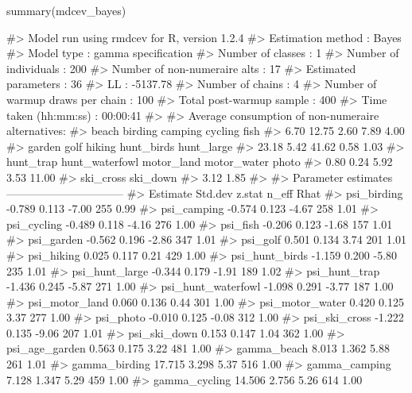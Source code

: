 \begin{example}
summary(mdcev_bayes)

#> Model run using rmdcev for R, version 1.2.4 
#> Estimation method                : Bayes
#> Model type                       : gamma specification
#> Number of classes                : 1
#> Number of individuals            : 200
#> Number of non-numeraire alts     : 17
#> Estimated parameters             : 36
#> LL                               : -5137.78
#> Number of chains                 : 4
#> Number of warmup draws per chain : 100
#> Total post-warmup sample         : 400
#> Time taken (hh:mm:ss)            : 00:00:41
#> 
#> Average consumption of non-numeraire alternatives:
#>          beach        birding        camping        cycling           fish 
#>           6.70          12.75           2.60           7.89           4.00 
#>         garden           golf         hiking     hunt_birds     hunt_large 
#>          23.18           5.42          41.62           0.58           1.03 
#>      hunt_trap hunt_waterfowl     motor_land    motor_water          photo 
#>           0.80           0.24           5.92           3.53          11.00 
#>      ski_cross       ski_down 
#>           3.12           1.85 
#> 
#> Parameter estimates --------------------------------  
#>                      Estimate Std.dev z.stat n_eff Rhat
#> psi_birding            -0.789   0.113  -7.00   255 0.99
#> psi_camping            -0.574   0.123  -4.67   258 1.01
#> psi_cycling            -0.489   0.118  -4.16   276 1.00
#> psi_fish               -0.206   0.123  -1.68   157 1.01
#> psi_garden             -0.562   0.196  -2.86   347 1.01
#> psi_golf                0.501   0.134   3.74   201 1.01
#> psi_hiking              0.025   0.117   0.21   429 1.00
#> psi_hunt_birds         -1.159   0.200  -5.80   235 1.01
#> psi_hunt_large         -0.344   0.179  -1.91   189 1.02
#> psi_hunt_trap          -1.436   0.245  -5.87   271 1.00
#> psi_hunt_waterfowl     -1.098   0.291  -3.77   187 1.00
#> psi_motor_land          0.060   0.136   0.44   301 1.00
#> psi_motor_water         0.420   0.125   3.37   277 1.00
#> psi_photo              -0.010   0.125  -0.08   312 1.00
#> psi_ski_cross          -1.222   0.135  -9.06   207 1.01
#> psi_ski_down            0.153   0.147   1.04   362 1.00
#> psi_age_garden          0.563   0.175   3.22   481 1.00
#> gamma_beach             8.013   1.362   5.88   261 1.01
#> gamma_birding          17.715   3.298   5.37   516 1.00
#> gamma_camping           7.128   1.347   5.29   459 1.00
#> gamma_cycling          14.506   2.756   5.26   614 1.00

\end{example}
